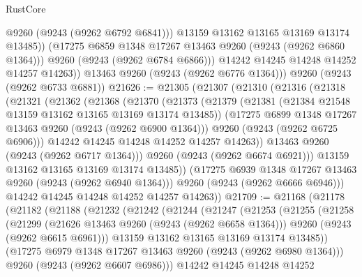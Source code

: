 \begin{lexlean}{RustCore}
\begin{coremodule}
                  @9260
                  (@9243 (@9262 @6792 @6841)))
                @13159
                @13162
                @13165
                @13169
                @13174
                @13485))
            (@17275 @6859 @1348 @17267 @13463 @9260 (@9243 (@9262 @6860 @1364)))
            @9260
            (@9243 (@9262 @6784 @6866)))
          @14242
          @14245
          @14248
          @14252
          @14257
          @14263))
      @13463
      @9260
      (@9243 (@9262 @6776 @1364)))
    @9260
    (@9243 (@9262 @6733 @6881))
@21626 := @21305
    (@21307
      (@21310
        (@21316
          (@21318
            (@21321
              (@21362
                (@21368
                  (@21370
                    (@21373
                      (@21379
                        (@21381 (@21384 @21548 @13159 @13162 @13165 @13169 @13174 @13485))
                        (@17275 @6899 @1348 @17267 @13463 @9260 (@9243 (@9262 @6900 @1364)))
                        @9260
                        (@9243 (@9262 @6725 @6906)))
                      @14242
                      @14245
                      @14248
                      @14252
                      @14257
                      @14263))
                  @13463
                  @9260
                  (@9243 (@9262 @6717 @1364)))
                @9260
                (@9243 (@9262 @6674 @6921)))
              @13159
              @13162
              @13165
              @13169
              @13174
              @13485))
          (@17275 @6939 @1348 @17267 @13463 @9260 (@9243 (@9262 @6940 @1364)))
          @9260
          (@9243 (@9262 @6666 @6946)))
        @14242
        @14245
        @14248
        @14252
        @14257
        @14263))
@21709 := @21168
    (@21178
      (@21182
        (@21188
          (@21232
            (@21242
              (@21244
                (@21247
                  (@21253
                    (@21255
                      (@21258
                        (@21299
                          (@21626 @13463 @9260 (@9243 (@9262 @6658 @1364)))
                          @9260
                          (@9243 (@9262 @6615 @6961)))
                        @13159
                        @13162
                        @13165
                        @13169
                        @13174
                        @13485))
                    (@17275 @6979 @1348 @17267 @13463 @9260 (@9243 (@9262 @6980 @1364)))
                    @9260
                    (@9243 (@9262 @6607 @6986)))
                  @14242
                  @14245
                  @14248
                  @14252

\end{coremodule}
\end{lexlean}
